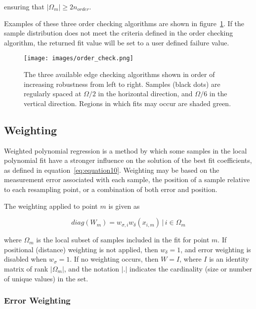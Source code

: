 ensuring that $|\Omega_m| \geq 2 n_{order}$.

Examples of these three order checking algorithms are shown in
figure~\ref{fig:order_check}.
If the sample distribution does not meet the criteria defined in the order
checking algorithm, the returned fit value will be set to a user defined
failure value.

\begin{figure}[H]
  \begin{center}
  \texttt{[image: images/order\_check.png]}
  \caption{The three available edge checking algorithms shown in order of
           increasing robustness from left to right.  Samples (black dots)
           are regularly spaced at $\Omega / 2$ in the horizontal direction,
           and $\Omega / 6$ in the vertical direction.  Regions in which
           fits may occur are shaded green.}
  \label{fig:order_check}
  \end{center}
\end{figure}


\subsection{Weighting}\label{subsec:weighting}

Weighted polynomial regression is a method by which some samples in the local
polynomial fit have a stronger influence on the solution of the best fit
coefficients, as defined in equation~\ref{eq:equation10}.
Weighting may be based on the measurement error associated with each sample,
the position of a sample relative to each resampling point, or a combination of
both error and position.

The weighting applied to point $m$ is given as

\begin{equation}
    diag(W_m) = w_{\sigma, i} w_{\delta}(x_{i, m})\, \vert \, i \in \Omega_m
    \label{eq:equation21}
\end{equation}

where $\Omega_m$ is the local subset of samples included in the fit for point
$m$.
If positional (distance) weighting is not applied, then $w_\delta = 1$, and
error weighting is disabled when $w_\sigma=1$.
If no weighting occurs, then $W = I$, where $I$ is an identity matrix of rank
$|\Omega_m|$, and the notation $|.|$ indicates the cardinality (size or number
of unique values) in the set.

\subsubsection{Error Weighting}\label{subsubsec:error-weighting}

